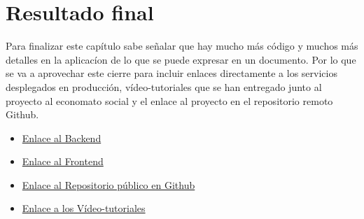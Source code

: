 \section{Resultado final}
Para finalizar este capítulo sabe señalar que hay mucho más código y muchos más detalles en la aplicacíon de lo que se puede expresar en un documento. Por lo que se va a aprovechar este cierre para incluir enlaces directamente a los servicios desplegados en producción, vídeo-tutoriales que se han entregado junto al proyecto al economato social y el enlace al proyecto en el repositorio remoto Github.
\begin{itemize}
    \item \href{https://economato-social-api.herokuapp.com}{Enlace al Backend} \citep{BACKEND}
    \item \href{ttps://economato-social.herokuapp.com}{Enlace al Frontend} \citep{FRONTEND}
    \item \href{https://github.com/DiegoMGar/TFG}{Enlace al Repositorio público en Github}  \citep{REPOSITORIO}
    \item \href{https://drive.google.com/drive/folders/1pv-6iishQkM29StiSHUyY74lWEVx0t6q}{Enlace a los Vídeo-tutoriales} \citep{VIDEOTUTORIALES}
\end{itemize}
